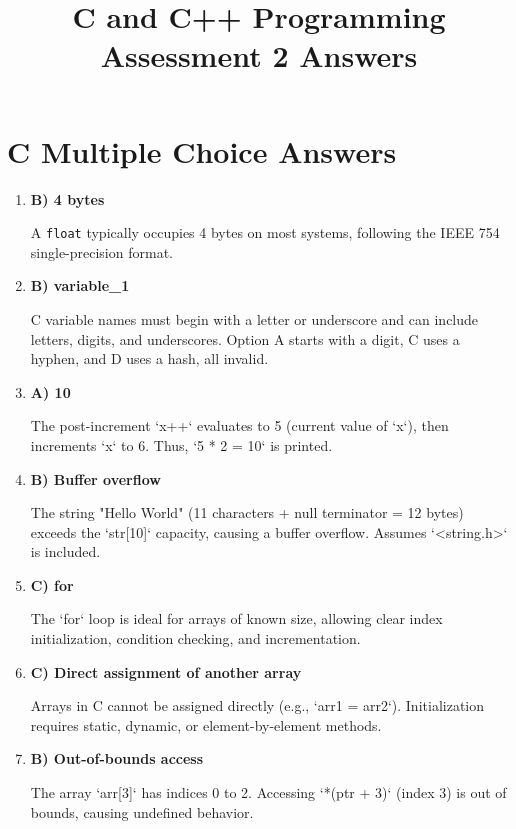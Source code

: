 \documentclass[a4paper,12pt]{article}
\begin{document}
\title{C and C++ Programming Assessment 2 Answers}
\maketitle

\newpage
\pagestyle{empty}

\section{C Multiple Choice Answers}

\begin{enumerate}
    \item \textbf{B) 4 bytes}

    A \verb|float| typically occupies 4 bytes on most systems, following the IEEE 754 single-precision format.

    \item \textbf{B) variable\_1}

    C variable names must begin with a letter or underscore and can include letters, digits, and underscores. Option A starts with a digit, C uses a hyphen, and D uses a hash, all invalid.

    \item \textbf{A) 10}

    The post-increment `x++` evaluates to 5 (current value of `x`), then increments `x` to 6. Thus, `5 * 2 = 10` is printed.

    \item \textbf{B) Buffer overflow}

    The string "Hello World" (11 characters + null terminator = 12 bytes) exceeds the `str[10]` capacity, causing a buffer overflow. Assumes `<string.h>` is included.

    \item \textbf{C) for}

    The `for` loop is ideal for arrays of known size, allowing clear index initialization, condition checking, and incrementation.

    \item \textbf{C) Direct assignment of another array}

    Arrays in C cannot be assigned directly (e.g., `arr1 = arr2`). Initialization requires static, dynamic, or element-by-element methods.

    \item \textbf{B) Out-of-bounds access}

    The array `arr[3]` has indices 0 to 2. Accessing `*(ptr + 3)` (index 3) is out of bounds, causing undefined behavior.


\end{enumerate}
\end{document}
